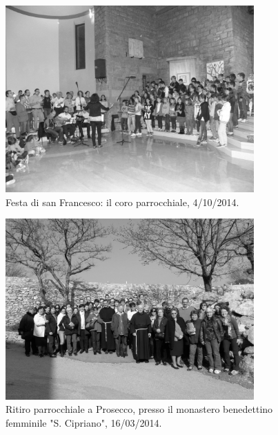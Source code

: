 \begin{figure}
    \captionsetup{labelformat=empty}
    \centering
	  \includegraphics[width=0.85\textwidth]{immagini/FestaSanFrancesco2014.jpg}
    \caption{Festa di san Francesco: il coro parrocchiale, 4/10/2014.}
		\vspace{-15pt}
\end{figure}
\newpage
\begin{figure}
    \captionsetup{labelformat=empty}
    \centering
	  \includegraphics[width=0.85\textwidth]{immagini/RitiroSanCipriano.jpg}
    \caption{Ritiro parrocchiale a Prosecco, presso il monastero benedettino femminile "S. Cipriano", 16/03/2014.}
		\vspace{-15pt}
\end{figure}
\newpage
